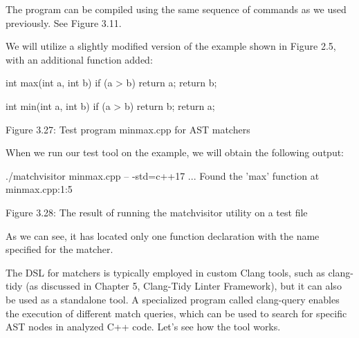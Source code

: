 The program can be compiled using the same sequence of commands as we used previously. See Figure 3.11.

We will utilize a slightly modified version of the example shown in Figure 2.5, with an additional function added:

\begin{cpp}
int max(int a, int b) {
  if (a > b) return a;
    return b;
}

int min(int a, int b) {
  if (a > b) return b;
    return a;
}
\end{cpp}

\begin{center}
Figure 3.27: Test program minmax.cpp for AST matchers
\end{center}

When we run our test tool on the example, we will obtain the following output:

\begin{shell}
./matchvisitor minmax.cpp -- -std=c++17
...
Found the ’max’ function at minmax.cpp:1:5
\end{shell}

\begin{center}
Figure 3.28: The result of running the matchvisitor utility on a test file
\end{center}

As we can see, it has located only one function declaration with the name specified for the matcher.

The DSL for matchers is typically employed in custom Clang tools, such as clang-tidy (as discussed in Chapter 5, Clang-Tidy Linter Framework), but it can also be used as a standalone tool. A specialized program called clang-query enables the execution of different match queries, which can be used to search for specific AST nodes in analyzed C++ code. Let’s see how the tool works.










































